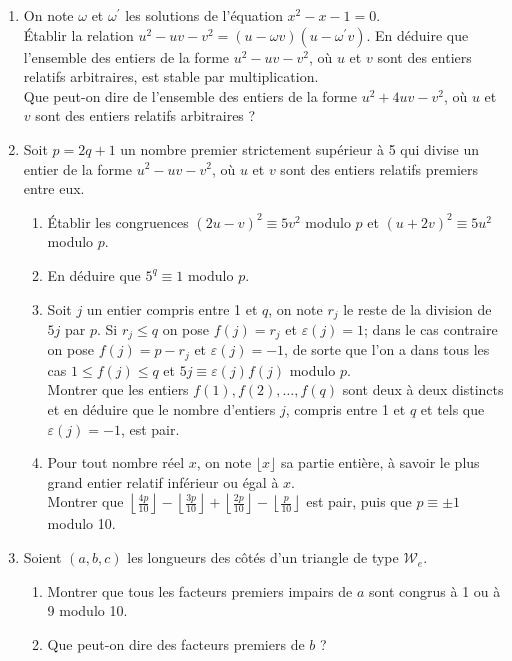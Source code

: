 \documentclass[landscape,twocolumn,leqno,a4paper,10pt]{report} %
\renewcommand{\leq}{\leqslant}
\begin{document}
\begin{enumerate}
	\item On note $\omega$ et $\omega^{\prime}$ les solutions de l'équation $x^{2}-x-1=0$.\\
	Établir la relation $u^{2}-u v-v^{2}=(u-\omega v)\left(u-\omega^{\prime} v\right)$. En déduire que l'ensemble des entiers de la forme $u^{2}-u v-v^{2}$, où $u$ et $v$ sont des entiers relatifs arbitraires, est stable par multiplication.\\
	Que peut-on dire de l'ensemble des entiers de la forme $u^{2}+4 u v-v^{2}$, où $u$ et $v$ sont des entiers relatifs arbitraires ?
	\item Soit $p=2 q+1$ un nombre premier strictement supérieur à 5 qui divise un entier de la forme $u^{2}-u v-v^{2}$, où $u$ et $v$ sont des entiers relatifs premiers entre eux.
	\begin{enumerate}
		\item Établir les congruences $(2 u-v)^{2} \equiv 5 v^{2}$ modulo $p$ et $(u+2 v)^{2} \equiv 5 u^{2}$ modulo $p$.
		\item En déduire que $5^{q} \equiv 1$ modulo $p$.
		\item Soit $j$ un entier compris entre 1 et $q$, on note $r_{j}$ le reste de la division de $5 j$ par $p$. Si $r_{j} \leq q$ on pose $f(j)=r_{j}$ et $\varepsilon(j)=1$; dans le cas contraire on pose $f(j)=p-r_{j}$ et $\varepsilon(j)=-1$, de sorte que l'on a dans tous les cas $1 \leq f(j) \leq q$ et $5 j \equiv \varepsilon(j) f(j)$ modulo $p$.\\
		Montrer que les entiers $f(1), f(2), \ldots, f(q)$ sont deux à deux distincts et en déduire que le nombre d'entiers $j$, compris entre 1 et $q$ et tels que $\varepsilon(j)=-1$, est pair.
		\item Pour tout nombre réel $x$, on note $\lfloor x\rfloor$ sa partie entière, à savoir le plus grand entier relatif inférieur ou égal à $x$.\\
		Montrer que $\left\lfloor\frac{4 p}{10}\right\rfloor-\left\lfloor\frac{3 p}{10}\right\rfloor+\left\lfloor\frac{2 p}{10}\right\rfloor-\left\lfloor\frac{p}{10}\right\rfloor$ est pair, puis que $p \equiv \pm 1$ modulo 10.
	\end{enumerate}
	\item Soient $(a, b, c)$ les longueurs des côtés d'un triangle de type $\mathscr{W}_{e}$.
	\begin{enumerate}
		\item Montrer que tous les facteurs premiers impairs de $a$ sont congrus à 1 ou à 9 modulo 10.
		\item Que peut-on dire des facteurs premiers de $b$ ?
	\end{enumerate}
\end{enumerate}
\end{document}
